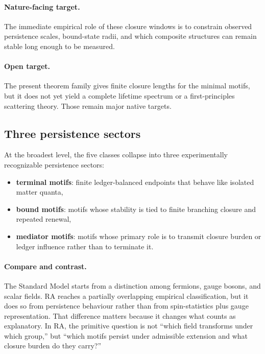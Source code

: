 \documentclass[11pt]{article}
\begin{document}
\paragraph{Nature-facing target.} The immediate empirical role of these closure windows is to constrain observed persistence scales, bound-state radii, and which composite structures can remain stable long enough to be measured.

\paragraph{Open target.} The present theorem family gives finite closure lengths for the minimal motifs, but it does not yet yield a complete lifetime spectrum or a first-principles scattering theory. Those remain major native targets.

\subsection{Three persistence sectors}

At the broadest level, the five classes collapse into three experimentally recognizable persistence sectors:
\begin{itemize}[nosep]
    \item \textbf{terminal motifs}: finite ledger-balanced endpoints that behave like isolated matter quanta,
    \item \textbf{bound motifs}: motifs whose stability is tied to finite branching closure and repeated renewal,
    \item \textbf{mediator motifs}: motifs whose primary role is to transmit closure burden or ledger influence rather than to terminate it.
\end{itemize}

\paragraph{Compare and contrast.} The Standard Model starts from a distinction among fermions, gauge bosons, and scalar fields. RA reaches a partially overlapping empirical classification, but it does so from persistence behaviour rather than from spin-statistics plus gauge representation. That difference matters because it changes what counts as explanatory. In RA, the primitive question is not ``which field transforms under which group,'' but ``which motifs persist under admissible extension and what closure burden do they carry?''
\end{document}

